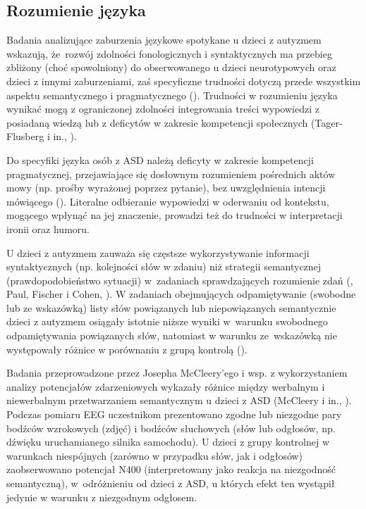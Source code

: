 
    \subsection{Rozumienie języka}
    \label{subsection:rozumienie}
    Badania analizujące zaburzenia językowe spotykane u dzieci z autyzmem wskazują, że~rozwój zdolności fonologicznych i syntaktycznych ma przebieg zbliżony (choć spowolniony) do obserwowanego u dzieci neurotypowych oraz dzieci z innymi zaburzeniami, zaś specyficzne trudności dotyczą przede wszystkim aspektu semantycznego i pragmatycznego (\cite{tager1981nature}).
    Trudności w rozumieniu języka wynikać mogą z ograniczonej zdolności integrowania treści wypowiedzi z posiadaną wiedzą lub z deficytów w zakresie kompetencji społecznych (Tager-Flusberg i in., \cite*{tager2005language}).
    
    Do specyfiki języka osób z ASD należą deficyty w zakresie kompetencji pragmatycznej, przejawiające się dosłownym rozumieniem pośrednich aktów mowy (np. prośby wyrażonej poprzez pytanie), bez uwzględnienia intencji mówiącego (\cite{frith2008autyzm}).
    Literalne odbieranie wypowiedzi w oderwaniu od kontekstu, mogącego wpłynąć na jej znaczenie, prowadzi też do trudności w interpretacji ironii oraz humoru.
    
    U dzieci z autyzmem zauważa się częstsze wykorzystywanie informacji syntaktycznych (np. kolejności słów w zdaniu) niż strategii semantycznej (prawdopodobieństwo sytuacji) w~zadaniach sprawdzających rozumienie zdań (\cite{tager1981sentence}, Paul, Fischer i Cohen, \cite*{paul1988brief}).
    W zadaniach obejmujących odpamiętywanie (swobodne lub ze wskazówką) listy słów powiązanych lub niepowiązanych semantycznie dzieci z autyzmem osiągały istotnie niższe wyniki w~warunku swobodnego odpamiętywania powiązanych słów, natomiast w warunku ze~wskazówką nie występowały różnice w porównaniu z grupą kontrolą (\cite{tager1991semantic}).
    
    Badania przeprowadzone przez Josepha McCleery'ego i wsp. z wykorzystaniem analizy potencjałów zdarzeniowych wykazały różnice między werbalnym i niewerbalnym przetwarzaniem semantycznym u dzieci z ASD (McCleery i in., \cite*{mccleery2010neural}).
    Podczas pomiaru EEG uczestnikom prezentowano zgodne lub niezgodne pary bodźców wzrokowych (zdjęć) i bodźców słuchowych (słów lub odgłosów, np. dźwięku uruchamianego silnika samochodu).
    U dzieci z grupy kontrolnej w warunkach niespójnych (zarówno w przypadku słów, jak i odgłosów) zaobserwowano potencjał N400 (interpretowany jako reakcja na niezgodność semantyczną), w~odróżnieniu od dzieci z ASD, u których efekt ten wystąpił jedynie w warunku z niezgodnym odgłosem.
    
